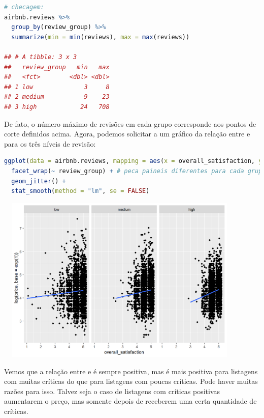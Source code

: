\documentclass{article}
\begin{document}
\begin{lstlisting}[language=R]
# checagem:
airbnb.reviews %>% 
  group_by(review_group) %>% 
  summarize(min = min(reviews), max = max(reviews))
  
## # A tibble: 3 x 3
##   review_group   min   max
##   <fct>        <dbl> <dbl>
## 1 low              3     8
## 2 medium           9    23
## 3 high            24   708
\end{lstlisting}

De fato, o número máximo de revisões em cada grupo corresponde aos pontos de corte definidos acima. Agora, podemos solicitar a \faRProject um gráfico da relação entre  e  para os três níveis de revisão:

\begin{lstlisting}[language=R]
ggplot(data = airbnb.reviews, mapping = aes(x = overall_satisfaction, y = log(price, base = exp(1)))) + # transformacao log de preco
  facet_wrap(~ review_group) + # peca paineis diferentes para cada grupo de revisao
  geom_jitter() +
  stat_smooth(method = "lm", se = FALSE)
\end{lstlisting}

\begin{center}
\includegraphics[width=12cm,height=8cm]{modelling_multiple_linreg_groups_plot-1.png} 
\end{center}

Vemos que a relação entre  e  é sempre positiva, mas é mais positiva para listagens com muitas críticas do que para listagens com poucas críticas. Pode haver muitas razões para isso. Talvez seja o caso de listagens com críticas positivas aumentarem o preço, mas somente depois de receberem uma certa quantidade de críticas.
\end{document}
